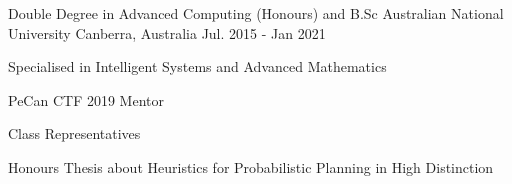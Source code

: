 

\begin{cventries}

  \cventry
    {Double Degree in Advanced Computing (Honours) and B.Sc} %
    {Australian National University} %
    {Canberra, Australia} %
    {Jul. 2015 - Jan 2021} %
    {
      \begin{cvitems} %
      	\item {Specialised in Intelligent Systems and Advanced Mathematics}
        \item {PeCan CTF 2019 Mentor}
        \item {Class Representatives}
        \item {Honours Thesis about Heuristics for Probabilistic Planning in High Distinction}
      \end{cvitems}
    }

\end{cventries}
